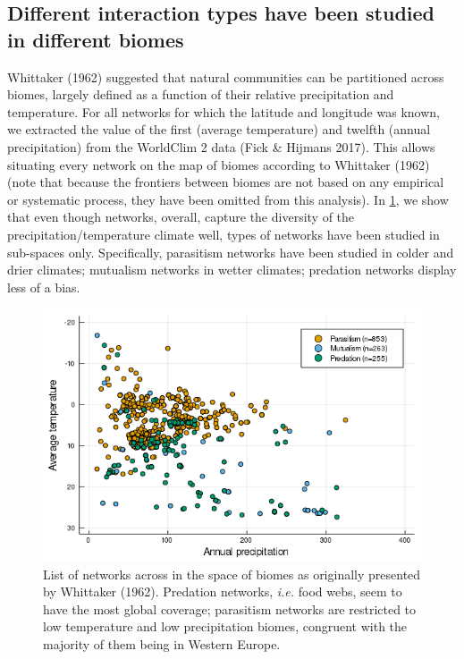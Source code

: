 \hypertarget{different-interaction-types-have-been-studied-in-different-biomes}{%
\subsection{Different interaction types have been studied in different
biomes}\label{different-interaction-types-have-been-studied-in-different-biomes}}

Whittaker (1962) suggested that natural communities can be partitioned
across biomes, largely defined as a function of their relative
precipitation and temperature. For all networks for which the latitude
and longitude was known, we extracted the value of the first (average
temperature) and twelfth (annual precipitation) from the WorldClim 2
data (Fick \& Hijmans 2017). This allows situating every network on the
map of biomes according to Whittaker (1962) (note that because the
frontiers between biomes are not based on any empirical or systematic
process, they have been omitted from this analysis). In
\cref{fig:biomes}, we show that even though networks,
overall, capture the diversity of the precipitation/temperature climate
well, types of networks have been studied in sub-spaces only.
Specifically, parasitism networks have been studied in colder and drier
climates; mutualism networks in wetter climates; predation networks
display less of a bias.

\begin{figure}
\centering
\includegraphics{figures/figure_02.png}
\caption{List of networks across in the space of biomes as originally
presented by Whittaker (1962). Predation networks, \emph{i.e.} food
webs, seem to have the most global coverage; parasitism networks are
restricted to low temperature and low precipitation biomes, congruent
with the majority of them being in Western Europe.\label{fig:biomes}}
\end{figure}

